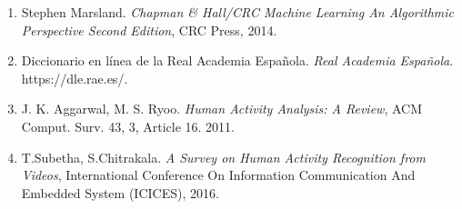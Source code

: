 \documentclass[a4paper,12pt,oneside,spanish]{book}
\begin{document}
\begin{enumerate}
	\item Stephen Marsland. \textit{Chapman \& Hall/CRC Machine Learning An Algorithmic Perspective Second Edition}, CRC Press, 2014.
	
	\item Diccionario en línea de la Real Academia Española. \textit{Real Academia Española}. https://dle.rae.es/.
	
	\item J. K. Aggarwal, M. S. Ryoo. \textit{Human Activity Analysis: A Review}, ACM Comput. Surv. 43, 3, Article 16. 2011.
	
	\item T.Subetha, S.Chitrakala. \textit{A Survey on Human Activity Recognition from Videos}, International Conference On Information Communication And Embedded System (ICICES), 2016.
\end{enumerate}
\end{document}
